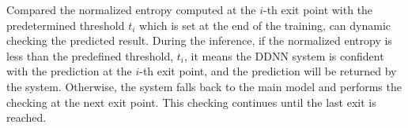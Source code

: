\documentclass[conference]{IEEEtran}
\begin{document}
%
%
Compared the normalized entropy computed at the $i$-th exit point with the predetermined threshold $t_{i}$ which is set at the end of the training, can dynamic checking the predicted result. During the inference, if the normalized entropy is less than the predefined threshold,  $t_{i}$, it means the DDNN system is confident with the prediction at the $i$-th exit point, and the prediction will be returned by the system. Otherwise, the system falls back to the main model and performs the checking at the next exit point. This checking continues until the last exit is reached.
\end{document}
